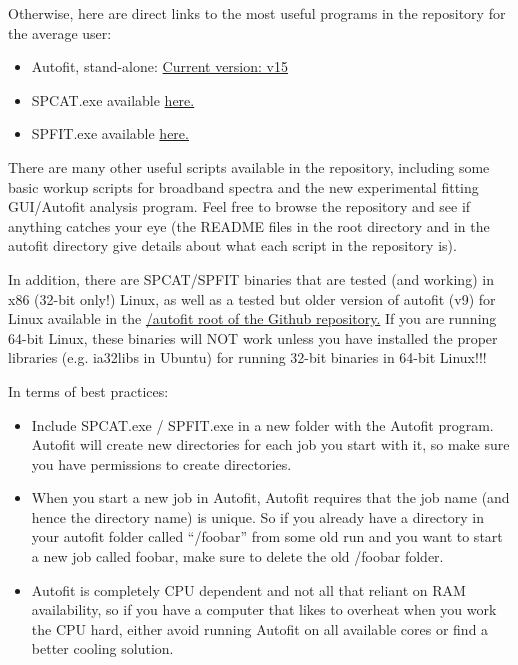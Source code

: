 \documentclass[letterpaper,10pt,english]{sphinxmanual}
\begin{document}
Otherwise, here are direct links to the most useful programs in the repository for the average user:
\begin{itemize}
\item {} 
Autofit, stand-alone: \href{https://raw.github.com/pategroup/bband\_scripts/master/autofit/windows/prog\_A\_v15.py}{Current version: v15}

\item {} 
SPCAT.exe available \href{https://github.com/pategroup/bband\_scripts/raw/master/autofit/windows/SPCAT.EXE}{here.}

\item {} 
SPFIT.exe available \href{https://github.com/pategroup/bband\_scripts/raw/master/autofit/windows/SPFIT.EXE}{here.}

\end{itemize}

There are many other useful scripts available in the repository, including some basic workup scripts for broadband spectra and the new experimental fitting GUI/Autofit analysis program. Feel free to browse the repository and see if anything catches your eye (the README files in the root directory and in the autofit directory give details about what each script in the repository is).

In addition, there are SPCAT/SPFIT binaries that are tested (and working) in x86 (32-bit only!) Linux, as well as a tested but older version of autofit (v9) for Linux available in the \href{https://github.com/pategroup/bband\_scripts/tree/master/autofit}{/autofit root of the Github repository.} If you are running 64-bit Linux, these binaries will NOT work unless you have installed the proper libraries (e.g. ia32libs in Ubuntu) for running 32-bit binaries in 64-bit Linux!!!

In terms of best practices:
\begin{itemize}
\item {} 
Include SPCAT.exe / SPFIT.exe in a new folder with the Autofit program. Autofit will create new directories for each job you start with it, so make sure you have permissions to create directories.

\item {} 
When you start a new job in Autofit, Autofit requires that the job name (and hence the directory name) is unique. So if you already have a directory in your autofit folder called ``/foobar'' from some old run and you want to start a new job called foobar, make sure to delete the old /foobar folder.

\item {} 
Autofit is completely CPU dependent and not all that reliant on RAM availability, so if you have a computer that likes to overheat when you work the CPU hard, either avoid running Autofit on all available cores or find a better cooling solution.

\end{itemize}
\end{document}
